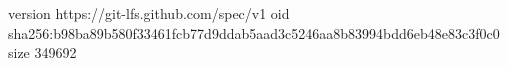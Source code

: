 version https://git-lfs.github.com/spec/v1
oid sha256:b98ba89b580f33461fcb77d9ddab5aad3c5246aa8b83994bdd6eb48e83c3f0c0
size 349692
